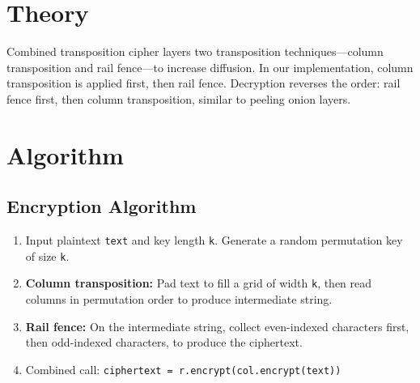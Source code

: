 
\section{Theory}
Combined transposition cipher layers two transposition techniques---column transposition and rail fence---to increase diffusion. In our implementation, column transposition is applied first, then rail fence. Decryption reverses the order: rail fence first, then column transposition, similar to peeling onion layers.


\section{Algorithm}
\subsection*{Encryption Algorithm}
\begin{enumerate}
  \item Input plaintext \texttt{text} and key length \texttt{k}. Generate a random permutation key of size \texttt{k}.
  \item \textbf{Column transposition:} Pad text to fill a grid of width \texttt{k}, then read columns in permutation order to produce intermediate string.
  \item \textbf{Rail fence:} On the intermediate string, collect even-indexed characters first, then odd-indexed characters, to produce the ciphertext.
  \item Combined call: \texttt{ciphertext = r.encrypt(col.encrypt(text))}
\end{enumerate}

